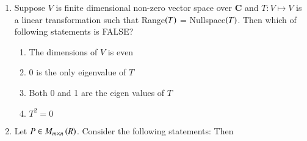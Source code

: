 \documentclass[journal]{IEEEtran}
\numberwithin{equation}{enumi}
\numberwithin{figure}{enumi}
\begin{document}
\begin{enumerate}
		\item
			Suppose $V$ is finite dimensional non-zero vector space over $\mathbf{C}$ and $T: V \mapsto V$ is a linear transformation such that Range$\left(T\right)$ = Nullspace$\left(T\right)$. Then which of following statements is FALSE?
		
		\begin{enumerate}
			\item The dimensions of $V$ is even 
			\item 0 is the only eigenvalue of $T$
			\item Both 0 and 1 are the eigen values of $T$
			\item $T^2 = 0$
		\end{enumerate}

		\item 
		Let $P \in M_{m \times n}\left(R\right)$. Consider the following statements:
		Then 
		\begin{enumerate}
		\end{enumerate}


\end{enumerate}
\end{document}
